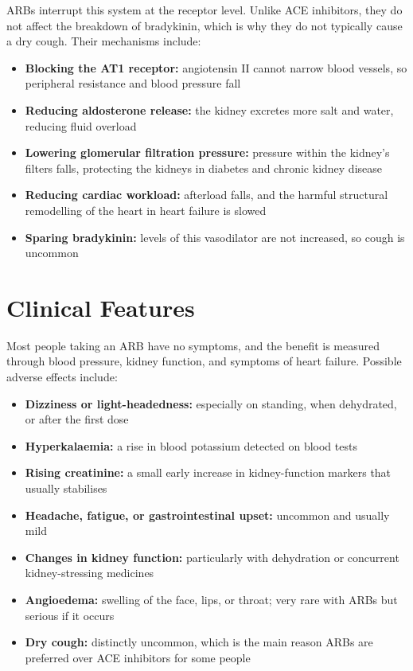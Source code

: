 ARBs interrupt this system at the receptor level. Unlike ACE inhibitors, they do not affect the breakdown of bradykinin, which is why they do not typically cause a dry cough. Their mechanisms include:

\begin{itemize}
    \item \textbf{Blocking the AT1 receptor:} angiotensin II cannot narrow blood vessels, so peripheral resistance and blood pressure fall
    \item \textbf{Reducing aldosterone release:} the kidney excretes more salt and water, reducing fluid overload
    \item \textbf{Lowering glomerular filtration pressure:} pressure within the kidney's filters falls, protecting the kidneys in diabetes and chronic kidney disease
    \item \textbf{Reducing cardiac workload:} afterload falls, and the harmful structural remodelling of the heart in heart failure is slowed
    \item \textbf{Sparing bradykinin:} levels of this vasodilator are not increased, so cough is uncommon
\end{itemize}

\section*{Clinical Features}
Most people taking an ARB have no symptoms, and the benefit is measured through blood pressure, kidney function, and symptoms of heart failure. Possible adverse effects include:

\begin{itemize}
    \item \textbf{Dizziness or light-headedness:} especially on standing, when dehydrated, or after the first dose
    \item \textbf{Hyperkalaemia:} a rise in blood potassium detected on blood tests
    \item \textbf{Rising creatinine:} a small early increase in kidney-function markers that usually stabilises
    \item \textbf{Headache, fatigue, or gastrointestinal upset:} uncommon and usually mild
    \item \textbf{Changes in kidney function:} particularly with dehydration or concurrent kidney-stressing medicines
    \item \textbf{Angioedema:} swelling of the face, lips, or throat; very rare with ARBs but serious if it occurs
    \item \textbf{Dry cough:} distinctly uncommon, which is the main reason ARBs are preferred over ACE inhibitors for some people
\end{itemize}


